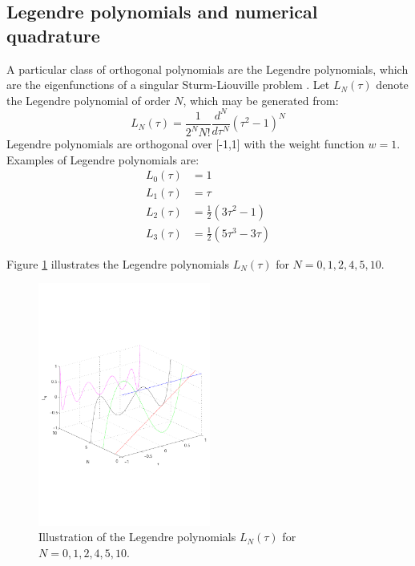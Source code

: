 \documentclass[a4paper,11pt]{report}    %
\begin{document}
\subsection{Legendre polynomials and numerical quadrature}

A particular class of orthogonal polynomials are the Legendre polynomials,
which are the eigenfunctions of a singular Sturm-Liouville problem \cite{Canuto:06}. 
Let $L_N(\tau)$ denote the Legendre polynomial of order $N$,
which may be generated from:
\[
 L_N(\tau) = \frac{1}{2^N N!}\frac{d^{N}}{d\tau^{N}}(\tau^2-1)^N
\]
Legendre polynomials are orthogonal over [-1,1] with the weight function $w=1$.
Examples of Legendre polynomials are:
\[
\begin{aligned}
  L_0(\tau) & = 1 \\
  L_1(\tau) & = \tau \\
  L_2(\tau) & = \frac{1}{2}( 3 \tau^2 - 1) \\
  L_3(\tau) & = \frac{1}{2}( 5 \tau^3 - 3\tau   ) 
\end{aligned}
\]




Figure \ref{legendrepoly} illustrates the Legendre polynomials $L_N(\tau)$ for $N = 0,1,2, 4,5, 10$.

\begin{figure}[htbp] 
 \centerline{\includegraphics[height=8cm]{legendrepoly.pdf}}
\caption{Illustration of the Legendre polynomials $L_N(\tau)$ for $N = 0,1,2, 4,5, 10$.}
\label{legendrepoly}
\end{figure}
\end{document}
